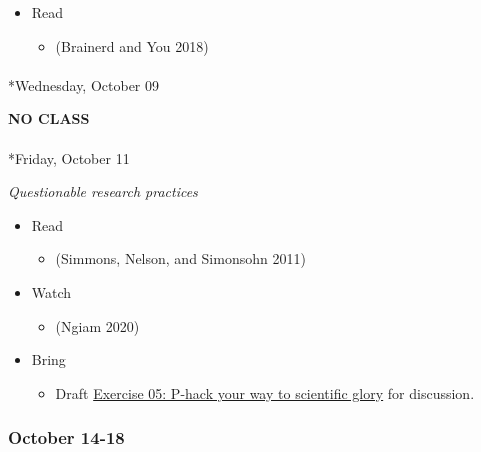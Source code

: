 \documentclass[
  letterpaper,
  DIV=11,
  numbers=noendperiod]{scrartcl}
\makeatletter
\let\oldparagraph\paragraph
\renewcommand{\paragraph}{
    \@ifstar
      \xxxParagraphStar
      \xxxParagraphNoStar
  }
\newcommand{\xxxParagraphStar}[1]{\oldparagraph*{#1}\mbox{}}
\newcommand{\xxxParagraphNoStar}[1]{\oldparagraph{#1}\mbox{}}
\providecommand{\tightlist}{%
  \setlength{\itemsep}{0pt}\setlength{\parskip}{0pt}}\usepackage{longtable,booktabs,array}
\makeatother
\begin{document}
\begin{itemize}
\tightlist
\item
  Read

  \begin{itemize}
  \tightlist
  \item
    (Brainerd and You 2018)
  \end{itemize}
\end{itemize}

\paragraph*{Wednesday, October 09}\label{wednesday-october-09}

\textbf{NO CLASS}

\paragraph*{Friday, October 11}\label{friday-october-11}

\emph{Questionable research practices}

\begin{itemize}
\tightlist
\item
  Read

  \begin{itemize}
  \tightlist
  \item
    (Simmons, Nelson, and Simonsohn 2011)
  \end{itemize}
\item
  Watch

  \begin{itemize}
  \tightlist
  \item
    (Ngiam 2020)
  \end{itemize}
\item
  Bring

  \begin{itemize}
  \tightlist
  \item
    Draft \href{exercises/ex05-p-hacking.qmd}{Exercise 05: P-hack your
    way to scientific glory} for discussion.
  \end{itemize}
\end{itemize}

\subsubsection*{October 14-18}\label{week-08}
\end{document}
